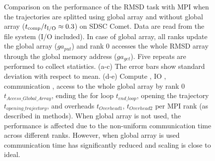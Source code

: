 \begin{figure}[ht!]
\caption{Comparison on the performance of the RMSD task with MPI when the trajectories are splitted using global array and without global array (${t}_{\text{comp}}/{t}_{\text{I/O}} \approx 0.3$) on SDSC Comet.
Data are read from the file system (I/O included). In case of global array, all ranks update the global array ($ga_{put}$) and rank 0 accesses the whole RMSD array through the global memory address ($ga_{get}$).
Five repeats are performed to collect statistics. (a-c) The error bars show standard deviation with respect to mean. 
(d-e) Compute \tcomp, IO \tIO, communication \tcomm, access to the whole global array by rank 0 $t_{Access\_Global\_Array}$, ending the for loop $t_{end\_loop}$, 
opening the trajectory $t_{opening\_trajectory}$, and overheads $t_{Overhead1}$, $t_{Overhead2}$ per MPI rank (as described in methods). When global array is not used, the performance is affected due to the non-uniform
communication time across different ranks. However, when global array is used communication time has significantly reduced and scaling is close to ideal.}
\label{fig:MPIwithIO-split}
\end{figure}

